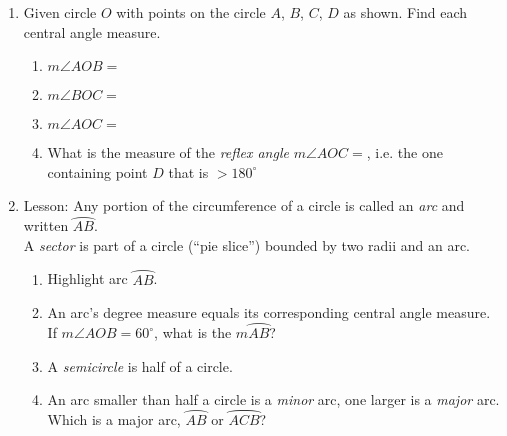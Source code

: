 \documentclass[12pt, twoside]{article}
\begin{document}
\begin{enumerate}
\newpage
\item Given circle $O$ with points on the circle $A$, $B$, $C$, $D$ as shown. Find each central angle measure.
  \begin{multicols}{2}
    \begin{enumerate} 
      \item $m\angle AOB =$
      \item $m\angle BOC =$
      \item $m\angle AOC =$
      \item What is the measure of the \emph{reflex angle} $m\angle AOC =$, i.e. the one containing point $D$ that is $>180^\circ$
      \end{enumerate}
  \end{multicols}

\newpage
\item Lesson: Any portion of the circumference of a circle is called an \emph{arc} and written $\wideparen{AB}$. \\[0.25cm]
A \emph{sector} is part of a circle (``pie slice'') bounded by two radii and an arc.
    \begin{multicols}{2}
    \raggedcolumns
    \begin{enumerate}[itemsep=0.5cm]
      \item Highlight arc $\wideparen{AB}$.
      \item An arc's degree measure equals its corresponding central angle measure. \\[0.25cm]
      If $m\angle AOB = 60^\circ$, what is the $m \wideparen{AB}$?
      \item A \emph{semicircle} is half of a circle.
      \item An arc smaller than half a circle is a \emph{minor} arc, one larger is a \emph{major} arc. \\[0.25cm]
      Which is a major arc, $\wideparen{AB}$ or $\wideparen{ACB}$?
    \end{enumerate}
    \end{multicols}


\end{enumerate}
\end{document}
